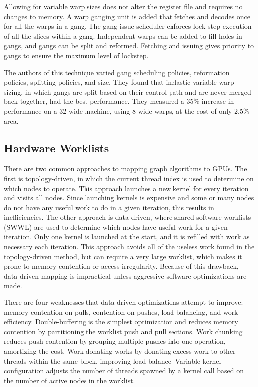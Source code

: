 \documentclass[prodmode,acmtecs]{acmsmall} %
\begin{document}
Allowing for variable warp sizes does not alter the register file and requires
no changes to memory. A warp ganging unit is added that fetches and decodes once
for all the warps in a gang. The gang issue scheduler enforces lock-step
execution of all the slices within a gang. Independent warps can be added to
fill holes in gangs, and gangs can be split and reformed. Fetching and issuing
gives priority to gangs to ensure the maximum level of lockstep.

The authors of this technique varied gang scheduling policies, reformation
policies, splitting policies, and size. They found that inelastic variable warp
sizing, in which gangs are split based on their control path and are never
merged back together, had the best performance. They measured a 35\% increase in
performance on a 32-wide machine, using 8-wide warps, at the cost of only 2.5\%
area.

\subsection{Hardware Worklists}
There are two common approaches to mapping graph algorithms to GPUs. The first
is topology-driven, in which the current thread index is used to determine on
which nodes to operate. This approach launches a new kernel for every iteration
and visits all nodes. Since launching kernels is expensive and some or many
nodes do not have any useful work to do in a given iteration, this results in
inefficiencies. The other approach is data-driven, where shared software
worklists (SWWL) are used to determine which nodes have useful work for a given
iteration. Only one kernel is launched at the start, and it is refilled with
work as necessary each iteration. This approach avoids all of the useless work
found in the topology-driven method, but can require a very large worklist,
which makes it prone to memory contention or access irregularity. Because of
this drawback, data-driven mapping is impractical unless aggressive software
optimizations are made.

There are four weaknesses that data-driven optimizations attempt to improve:
memory contention on pulls, contention on pushes, load balancing, and work
efficiency. Double-buffering is the simplest optimization and reduces memory
contention by partitioning the worklist push and pull sections. Work chunking
reduces push contention by grouping multiple pushes into one operation,
amortizing the cost. Work donating works by donating excess work to other
threads within the same block, improving load balance. Variable kernel
configuration adjusts the number of threads spawned by a kernel call based on
the number of active nodes in the worklist.
\end{document}
